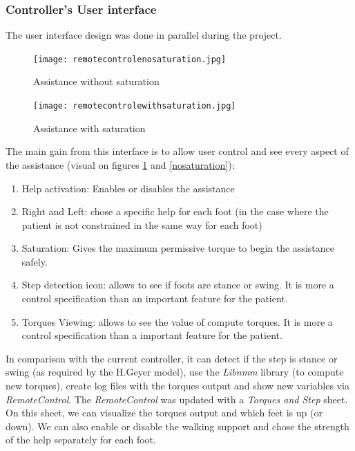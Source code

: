 \documentclass[a4paper,12pt]{article}
\begin{document}
\subsubsection{Controller's User interface}
The user interface design was done in parallel during the project.  
\medbreak

\begin{figure}[H]
\begin{minipage}[c]{.43\linewidth}
     \begin{center}
             \texttt{[image: remotecontrolenosaturation.jpg]}
             \caption{Assistance without saturation}
             \label{nosaturation}
         \end{center}
   \end{minipage} \hfill
   \begin{minipage}[c]{.43\linewidth}
    \begin{center}
            \texttt{[image: remotecontrolewithsaturation.jpg]}
			\caption{Assistance with saturation}
            \label{saturation}
        \end{center}
 \end{minipage}
\end{figure}

The main gain from this interface is to allow user control and see every aspect of the assistance (visual on figures \ref{saturation} and \ref{nosaturation}):
\begin{enumerate}
	\item Help activation: Enables or disables the assistance
    \item Right and Left: chose a specific help for each foot (in the case where the patient is not constrained in the same way for each foot) 
    \item Saturation: Gives the maximum permissive torque to begin the assistance safely.
    \item Step detection icon: allows to see if foots are stance or swing. It is more a control specification than an important feature for the patient.
    \item Torques Viewing: allows to see the value of compute torques. It is more a control specification than a important feature for the patient.								
\end{enumerate}

In comparison with the current controller, it can detect if the step is stance or swing (as required by the H.Geyer model), use the \textit{Libnmm} library (to compute new torques), create log files with the torques output and show new variables via \textit{RemoteControl}.
\medbreak
The \textit{RemoteControl} was updated with a \textit{Torques and Step} sheet. On this sheet, we can visualize the torques output and which feet is up (or down). We can also enable or disable the walking support and chose the strength of the help separately for each foot. \\
\end{document}
